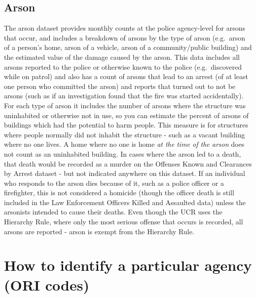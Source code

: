 \documentclass[
  12pt,
  openany]{book}
\begin{document}
\hypertarget{arson}{%
\subsection{Arson}\label{arson}}

The arson dataset provides monthly counts at the police agency-level for arsons that occur, and includes a breakdown of arsons by the type of arson (e.g.~arson of a person's home, arson of a vehicle, arson of a community/public building) and the estimated value of the damage caused by the arson. This data includes all arsons reported to the police or otherwise known to the police (e.g.~discovered while on patrol) and also has a count of arsons that lead to an arrest (of at least one person who committed the arson) and reports that turned out to not be arsons (such as if an investigation found that the fire was started accidentally). For each type of arson it includes the number of arsons where the structure was uninhabited or otherwise not in use, so you can estimate the percent of arsons of buildings which had the potential to harm people. This measure is for structures where people normally did not inhabit the structure - such as a vacant building where no one lives. A home where no one is home \emph{at the time of the arson} does not count as an uninhabited building. In cases where the arson led to a death, that death would be recorded as a murder on the Offenses Known and Clearances by Arrest dataset - but not indicated anywhere on this dataset. If an individual who responds to the arson dies because of it, such as a police officer or a firefighter, this is not considered a homicide (though the officer death is still included in the Law Enforcement Officers Killed and Assaulted data) unless the arsonists intended to cause their deaths. Even though the UCR uses the Hierarchy Rule, where only the most serious offense that occurs is recorded, all arsons are reported - arson is exempt from the Hierarchy Rule.

\hypertarget{how-to-identify-a-particular-agency-ori-codes}{%
\section{How to identify a particular agency (ORI codes)}\label{how-to-identify-a-particular-agency-ori-codes}}
\end{document}

